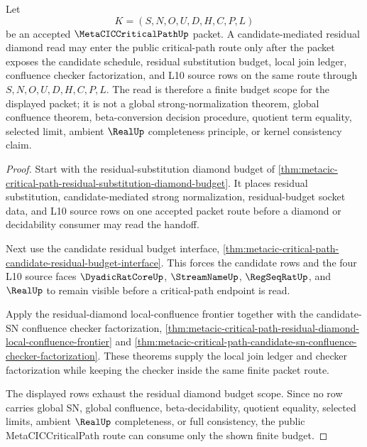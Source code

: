 \begin{theorem}
\label{thm:metacic-critical-path-residual-diamond-budget-scope}
Let
$$
K=(S,N,O,U,D,H,C,P,L)
$$
be an accepted $\MetaCICCriticalPathUp$ packet. A candidate-mediated residual diamond read may enter the public critical-path route only after the packet exposes the candidate schedule, residual substitution budget, local join ledger, confluence checker factorization, and L10 source rows on the same route through $S,N,O,U,D,H,C,P,L$. The read is therefore a finite budget scope for the displayed packet; it is not a global strong-normalization theorem, global confluence theorem, beta-conversion decision procedure, quotient term equality, selected limit, ambient $\RealUp$ completeness principle, or kernel consistency claim.
\end{theorem}
\begin{proof}
Start with the residual-substitution diamond budget of \autoref{thm:metacic-critical-path-residual-substitution-diamond-budget}. It places residual substitution, candidate-mediated strong normalization, residual-budget socket data, and L10 source rows on one accepted packet route before a diamond or decidability consumer may read the handoff.

Next use the candidate residual budget interface, \autoref{thm:metacic-critical-path-candidate-residual-budget-interface}. This forces the candidate rows and the four L10 source faces $\DyadicRatCoreUp$, $\StreamNameUp$, $\RegSeqRatUp$, and $\RealUp$ to remain visible before a critical-path endpoint is read.

Apply the residual-diamond local-confluence frontier together with the candidate-SN confluence checker factorization, \autoref{thm:metacic-critical-path-residual-diamond-local-confluence-frontier} and \autoref{thm:metacic-critical-path-candidate-sn-confluence-checker-factorization}. These theorems supply the local join ledger and checker factorization while keeping the checker inside the same finite packet route.

The displayed rows exhaust the residual diamond budget scope. Since no row carries global SN, global confluence, beta-decidability, quotient equality, selected limits, ambient $\RealUp$ completeness, or full consistency, the public MetaCICCriticalPath route can consume only the shown finite budget.
\end{proof}


